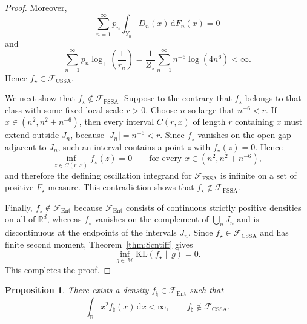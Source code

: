 \documentclass[11pt]{article}
\newtheorem{proposition}[theorem]{Proposition}
\theoremstyle{definition}
\begin{document}
\begin{proof}
Moreover,
\[
\sum_{n=1}^\infty p_n\int_{Y_n} D_n(x)\,\mathrm{d}F_n(x)=0
\]
and
\[
\sum_{n=1}^\infty p_n\log_+\!\left(\frac1{r_n}\right)
=\frac{1}{Z_\star}\sum_{n=1}^\infty n^{-6}\log(4n^6)<\infty.
\]
Hence $f_\star\in\mathcal F_{\mathrm{CSSA}}$.

We next show that $f_\star\notin\mathcal F_{\mathrm{FSSA}}$. Suppose to the contrary that $f_\star$ belongs to that class with some fixed local scale $r>0$. Choose $n$ so large that $n^{-6}<r$. If $x\in (n^2,n^2+n^{-6})$, then every interval $C(r,x)$ of length $r$ containing $x$ must extend outside $J_n$, because $|J_n|=n^{-6}<r$. Since $f_\star$ vanishes on the open gap adjacent to $J_n$, such an interval contains a point $z$ with $f_\star(z)=0$. Hence
\[
\inf_{z\in C(r,x)} f_\star(z)=0
\qquad\text{for every }x\in (n^2,n^2+n^{-6}),
\]
and therefore the defining oscillation integrand for $\mathcal F_{\mathrm{FSSA}}$ is infinite on a set of positive $F_\star$-measure. This contradiction shows that $f_\star\notin\mathcal F_{\mathrm{FSSA}}$.

Finally, $f_\star\notin\mathcal F_{\mathrm{Ent}}$ because $\mathcal F_{\mathrm{Ent}}$ consists of continuous strictly positive densities on all of $\mathbb{R}^d$, whereas $f_\star$ vanishes on the complement of $\bigcup_n J_n$ and is discontinuous at the endpoints of the intervals $J_n$. Since $f_\star\in\mathcal F_{\mathrm{CSSA}}$ and has finite second moment, Theorem~\ref{thm:Scntiff} gives
\[
\inf_{g\in\mathcal M}\mathrm{KL}(f_\star\|g)=0.
\]
This completes the proof.
\end{proof}

\begin{proposition}
\label{prop:Ent-not-Scnt}
There exists a density $f_\natural\in\mathcal F_{\mathrm{Ent}}$ such that
\[
\int_{\mathbb{R}} x^2 f_\natural(x)\,\mathrm{d}x<\infty,
\qquad
f_\natural\notin\mathcal F_{\mathrm{CSSA}}.
\]
\end{proposition}
\end{document}
